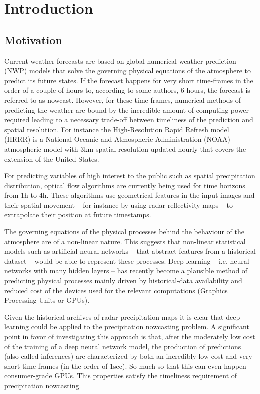 \chapter{Introduction}\label{chap1}
\thispagestyle{plain}

\section{Motivation}
Current weather forecasts are based on global numerical weather prediction (NWP) models that solve the governing physical equations of the atmosphere to predict its future states. If the forecast happens for very short time-frames in the order of a couple of hours to, according to some authors, 6 hours, the forecast is referred to as nowcast. However, for these time-frames, numerical methods of predicting the weather are bound by the incredible amount of computing power required leading to a necessary trade-off between timeliness of the prediction and spatial resolution. For instance the High-Resolution Rapid Refresh model (HRRR) is a National Oceanic and Atmospheric Administration (NOAA) atmospheric model with 3km spatial resolution updated hourly \citep{NOAA2021} that covers the extension of the United States. 

For predicting variables of high interest to the public such as spatial precipitation distribution, optical flow algorithms are currently being used for time horizons from 1h to 4h. These algorithms use geometrical features in the input images and their spatial movement -- for instance by using radar reflectivity maps -- to extrapolate their position at future timestamps.

The governing equations of the physical processes behind the behaviour of the atmosphere are of a non-linear nature. This suggests that non-linear statistical models such as artificial neural networks -- that abstract features from a historical dataset -- would be able to represent these processes. Deep learning -- i.e. neural networks with many hidden layers -- has recently become a plausible method of predicting physical processes mainly driven by historical-data availability and reduced cost of the devices used for the relevant computations (Graphics Processing Units or GPUs).

Given the historical archives of radar precipitation maps it is clear that deep learning could be applied to the precipitation nowcasting problem. A significant point in favor of investigating this approach is that, after the moderately low cost of the training of a deep neural network model, the production of predictions (also called inferences) are characterized by both an incredibly low cost and very short time frames (in the order of 1sec). So much so that this can even happen consumer-grade GPUs. This properties satisfy the timeliness requirement of precipitation nowcasting.

